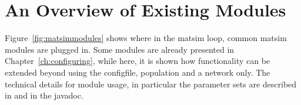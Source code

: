 %




\section{An Overview of Existing Modules}
Figure~\ref{fig:matsimmodules} shows where in the \gls{matsim} loop, common \gls{matsim} modules are plugged in. Some modules are already presented in Chapter~\ref{ch:configuring}, while here, it is shown how functionality can be extended beyond using the \gls{configfile}, population and a network only. The technical details for module usage, in particular the parameter sets are described in \citep[][]{MATSim_Userguide_2015} and in the javadoc.

